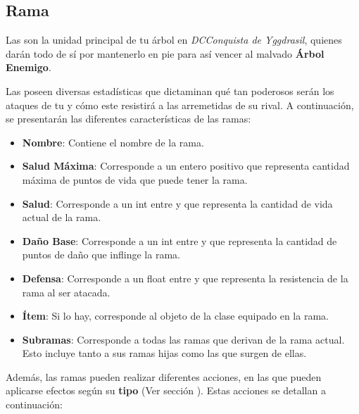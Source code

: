 \subsection{Rama} \label{subsec:Rama}

Las  son la unidad principal de tu árbol en \textit{DCConquista de Yggdrasil}, quienes darán todo de sí por mantenerlo en pie para así vencer al malvado \textbf{Árbol Enemigo}.

Las  poseen diversas estadísticas que dictaminan qué tan poderosos serán los ataques de tu  y cómo este resistirá a las arremetidas de su rival. A continuación, se presentarán las diferentes características de las ramas:

\begin{itemize}
    \item \textbf{Nombre}: Contiene el nombre de la rama.
    \item \textbf{Salud Máxima}: Corresponde a un entero positivo que representa cantidad máxima de puntos de vida que puede tener la rama. 
    \item \textbf{Salud}: Corresponde a un int entre  y  que representa la cantidad de vida actual de la rama.
    \item \textbf{Daño Base}: Corresponde a un int entre  y  que representa la cantidad de puntos de daño que inflinge la rama.
    \item \textbf{Defensa}: Corresponde a un float entre  y  que representa la resistencia de la rama al ser atacada.
    \item \textbf{Ítem}: Si lo hay, corresponde al objeto de la clase  equipado en la rama.
    \item \textbf{Subramas}: Corresponde a todas las ramas que derivan de la rama actual. Esto incluye tanto a sus ramas hijas como las que surgen de ellas.
\end{itemize}
Además, las ramas pueden realizar diferentes acciones, en las que pueden aplicarse efectos según su \textbf{tipo} (Ver sección ). Estas acciones se detallan a continuación:

